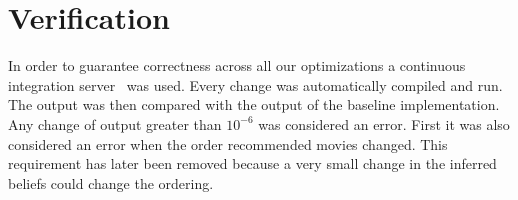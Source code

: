 \section{Verification}\label{sec:verification}
In order to guarantee correctness across all our optimizations a continuous integration server~\cite{jenkins} was used. Every change was automatically compiled and run. The output was then compared with the output of the baseline implementation. Any change of output greater than $10^{-6}$ was considered an error. First it was also considered an error when the order recommended movies changed. This requirement has later been removed because a very small change in the inferred beliefs could change the ordering.